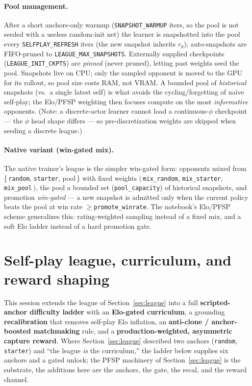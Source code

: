 \documentclass[11pt]{article}
\begin{document}
\paragraph{Pool management.} After a short anchors-only warmup (\texttt{SNAPSHOT\_WARMUP} iters, so the
pool is not seeded with a useless random-init net) the learner is snapshotted into the pool every
\texttt{SELFPLAY\_REFRESH} iters (the new snapshot inherits $r_\theta$); auto-snapshots are FIFO-pruned
to \texttt{LEAGUE\_MAX\_SNAPSHOTS}. Externally supplied checkpoints (\texttt{LEAGUE\_INIT\_CKPTS}) are
\emph{pinned} (never pruned), letting past weights seed the pool. Snapshots live on CPU; only the sampled
opponent is moved to the GPU for its rollout, so pool size costs RAM, not VRAM. A bounded pool of
\emph{historical} snapshots (vs.\ a single latest self) is what avoids the cycling/forgetting of naive
self-play; the Elo/PFSP weighting then focuses compute on the most \emph{informative} opponents. (Note:
a discrete-actor learner cannot load a continuous-$\phi$ checkpoint --- the $\phi$ head shape differs ---
so pre-discretization weights are skipped when seeding a discrete league.)

\paragraph{Native variant (win-gated mix).} The native trainer's league is the simpler win-gated form:
opponents mixed from \{\,\texttt{random}, \texttt{starter}, pool\,\} with fixed weights
$(\,$\texttt{mix\_random}, \texttt{mix\_starter}, \texttt{mix\_pool}$\,)$, the pool a bounded set
(\texttt{pool\_capacity}) of historical snapshots, and promotion \emph{win-gated} --- a new snapshot is
admitted only when the current policy beats the pool at win rate $\geq$\texttt{promote\_winrate}. The
notebook's Elo/PFSP scheme generalizes this: rating-weighted sampling instead of a fixed mix, and a
soft Elo ladder instead of a hard promotion gate.

\section{Self-play league, curriculum, and reward shaping}\label{sec:interventions}
This session extends the league of Section~\ref{sec:league} into a full \textbf{scripted-anchor
difficulty ladder} with an \textbf{Elo-gated curriculum}, a grounding \textbf{recalibration} that
removes self-play Elo inflation, an \textbf{anti-clone / anchor-boosted matchmaking} rule, and a
\textbf{production-weighted, asymmetric capture reward}. Where Section~\ref{sec:league} described two
anchors (\texttt{random}, \texttt{starter}) and ``the league \emph{is} the curriculum,'' the ladder
below supplies six anchors and a gated unlock; the PFSP machinery of Section~\ref{sec:league} is the
substrate, the additions here are the anchors, the gate, the recal, and the reward channel.
\end{document}
